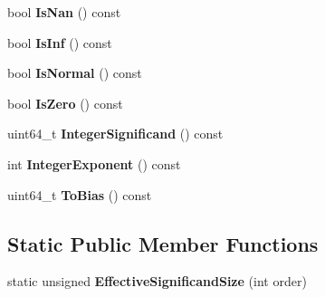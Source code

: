 \begin{DoxyCompactItemize}
\item 
bool {\bfseries Is\+Nan} () const \hypertarget{classinternal_1_1_double_a5c1ad93b8c866afdd5c2b412ef7bea98}{}\label{classinternal_1_1_double_a5c1ad93b8c866afdd5c2b412ef7bea98}

\item 
bool {\bfseries Is\+Inf} () const \hypertarget{classinternal_1_1_double_a2efab47ffbfa75e0fca1129263b86545}{}\label{classinternal_1_1_double_a2efab47ffbfa75e0fca1129263b86545}

\item 
bool {\bfseries Is\+Normal} () const \hypertarget{classinternal_1_1_double_ac34b7871eeb80d2b6bac48f144c97b51}{}\label{classinternal_1_1_double_ac34b7871eeb80d2b6bac48f144c97b51}

\item 
bool {\bfseries Is\+Zero} () const \hypertarget{classinternal_1_1_double_a6eb58f2690af582efeb9b76ef35c4c60}{}\label{classinternal_1_1_double_a6eb58f2690af582efeb9b76ef35c4c60}

\item 
uint64\+\_\+t {\bfseries Integer\+Significand} () const \hypertarget{classinternal_1_1_double_a96c5e0f06551e83565b5097950d30e32}{}\label{classinternal_1_1_double_a96c5e0f06551e83565b5097950d30e32}

\item 
int {\bfseries Integer\+Exponent} () const \hypertarget{classinternal_1_1_double_a8e16ee31d521fb56f0b98be427a9d47e}{}\label{classinternal_1_1_double_a8e16ee31d521fb56f0b98be427a9d47e}

\item 
uint64\+\_\+t {\bfseries To\+Bias} () const \hypertarget{classinternal_1_1_double_af8b543dc813f761d274824f7cef00a43}{}\label{classinternal_1_1_double_af8b543dc813f761d274824f7cef00a43}

\end{DoxyCompactItemize}
\subsection*{Static Public Member Functions}
\begin{DoxyCompactItemize}
\item 
static unsigned {\bfseries Effective\+Significand\+Size} (int order)\hypertarget{classinternal_1_1_double_a980c26d006068b23406805e9b0e02588}{}\label{classinternal_1_1_double_a980c26d006068b23406805e9b0e02588}

\end{DoxyCompactItemize}
